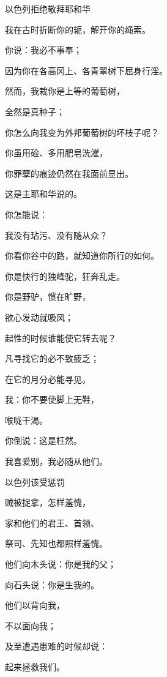 {\par }{\SH 以色列拒绝敬拜耶和华
\par }{\PP {}我在古时折断你的轭，解开你的绳索。
\par }{\Q 你说：我必不事奉{}；
\par }{\PP 因为你在各高冈上、各青翠树下屈身行淫。
\par }{\Q {}然而，我栽你是上等的葡萄树，
\par }{\Q 全然是真种子；
\par }{\Q 你怎么向我变为外邦葡萄树的坏枝子呢？
\par }{\Q {}你虽用硷、多用肥皂洗濯，
\par }{\Q 你罪孽的痕迹仍然在我面前显出。
\par }{\Q 这是主耶和华说的。
\par }{\Q {}你怎能说：
\par }{\Q 我没有玷污、没有随从众{}？
\par }{\Q 你看你谷中的路，就知道你所行的如何。
\par }{\Q 你是快行的独峰驼，狂奔乱走。
\par }{\Q {}你是野驴，惯在旷野，
\par }{\Q 欲心发动就吸风；
\par }{\Q 起性的时候谁能使它转去呢？
\par }{\Q 凡寻找它的必不致疲乏；
\par }{\Q 在它的月分必能寻见。
\par }{\Q {}我{}：你不要使脚上无鞋，
\par }{\Q 喉咙干渴。
\par }{\Q 你倒说：这是枉然。
\par }{\Q 我喜爱别{}，我必随从他们。
\par }{\SH 以色列该受惩罚
\par }{\Q {}贼被捉拿，怎样羞愧，
\par }{家和他们的君王、首领、
\par }{\Q 祭司、先知也都照样羞愧。
\par }{\Q {}他们向木头说：你是我的父；
\par }{\Q 向石头说：你是生我的。
\par }{\Q 他们以背向我，
\par }{\Q 不以面向我；
\par }{\Q 及至遭遇患难的时候却说：
\par }{\Q 起来拯救我们。
}
